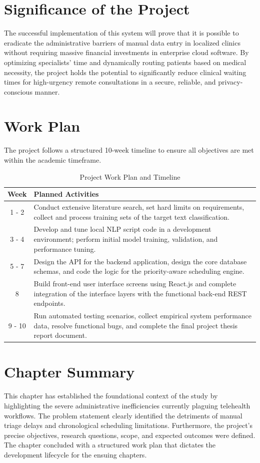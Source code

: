 \documentclass[12pt,a4paper]{report}
\begin{document}
\section{Significance of the Project}
The successful implementation of this system will prove that it is possible to eradicate the administrative barriers of manual data entry in localized clinics without requiring massive financial investments in enterprise cloud software. By optimizing specialists' time and dynamically routing patients based on medical necessity, the project holds the potential to significantly reduce clinical waiting times for high-urgency remote consultations in a secure, reliable, and privacy-conscious manner.

\section{Work Plan}
The project follows a structured 10-week timeline to ensure all objectives are met within the academic timeframe.

\begin{table}[h]
\centering
\caption{Project Work Plan and Timeline}
\begin{tabularx}{\textwidth}{|c|X|}
\hline
\textbf{Week} & \textbf{Planned Activities} \\ \hline
1 - 2 & Conduct extensive literature search, set hard limits on requirements, collect and process training sets of the target text classification. \\ \hline
3 - 4 & Develop and tune local NLP script code in a development environment; perform initial model training, validation, and performance tuning. \\ \hline
5 - 7 & Design the API for the backend application, design the core database schemas, and code the logic for the priority-aware scheduling engine. \\ \hline
8 & Build front-end user interface screens using React.js and complete integration of the interface layers with the functional back-end REST endpoints. \\ \hline
9 - 10 & Run automated testing scenarios, collect empirical system performance data, resolve functional bugs, and complete the final project thesis report document. \\ \hline
\end{tabularx}
\end{table}

\section{Chapter Summary}
This chapter has established the foundational context of the study by highlighting the severe administrative inefficiencies currently plaguing telehealth workflows. The problem statement clearly identified the detriments of manual triage delays and chronological scheduling limitations. Furthermore, the project's precise objectives, research questions, scope, and expected outcomes were defined. The chapter concluded with a structured work plan that dictates the development lifecycle for the ensuing chapters.
\end{document}
